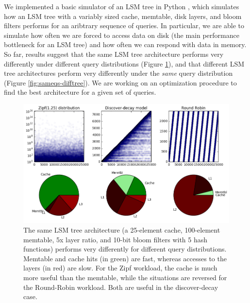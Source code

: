 \documentclass[11pt]{article}
\begin{document}
We implemented a basic simulator of an LSM tree in Python \citep{lsmulator}, which simulates how an LSM tree with a variably sized cache, memtable, disk layers, and bloom filters performs for an aribtrary sequence of queries. In particular, we are able to simulate how often we are forced to access data on disk (the main performance bottleneck for an LSM tree) and how often we can respond with data in memory. So far, results suggest that the same LSM tree architecture performs very differently under different query distributions (Figure \ref{fig:sametree-diffqs}), and that different LSM tree architectures perform very differently under the \textit{same} query distribution (Figure \ref{fig:sameqs-difftree}). We are working on an optimization procedure to find the best architecture for a given set of queries.

\begin{figure}[!htb]
\begin{center}
\includegraphics[width=\textwidth]{sametree-diffqs.png}
\end{center}
\caption{The same LSM tree architecture (a 25-element cache, 100-element memtable, 5x layer ratio, and 10-bit bloom filters with 5 hash functions) performs very differently for different query distributions. Memtable and cache hits (in green) are fast, whereas accesses to the layers (in red) are slow. For the Zipf workload, the cache is much more useful than the memtable, while the situations are reversed for the Round-Robin workload. Both are useful in the discover-decay case.}
\label{fig:sametree-diffqs}
\end{figure}
\end{document}
